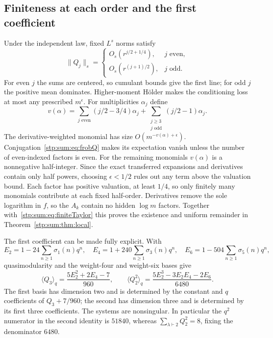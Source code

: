 \documentclass[11pt]{article}
\theoremstyle{remark}\newtheorem{remark}[theorem]{Remark}
\begin{document}
\subsection{Finiteness at each order and the first coefficient}
Under the independent law, fixed $L^s$ norms satisfy
\[
 \|Q_j\|_s=
 \begin{cases}
 O_s(r^{j/2+1/4}),&j\text{ even},\\
 O_s(r^{(j+1)/2}),&j\text{ odd}.
 \end{cases}
\]
For even $j$ the sums are centered, so cumulant bounds give the first line; for odd $j$ the positive mean dominates. Higher-moment Hölder makes the conditioning loss at most any prescribed $m^\epsilon$. For multiplicities $\alpha_j$ define
\[
 v(\alpha)=\sum_{j\text{ even}}(j/2-3/4)\alpha_j
       +\sum_{\substack{j\ge3\\j\text{ odd}}}(j/2-1)\alpha_j.
\]
The derivative-weighted monomial has size $O(m^{-v(\alpha)+\epsilon})$. Conjugation~\eqref{stp:sum:eq:frobQ} makes its expectation vanish unless the number of even-indexed factors is even. For the remaining monomials $v(\alpha)$ is a nonnegative half-integer. Since the exact transferred expansions and derivatives contain only half powers, choosing $\epsilon<1/2$ rules out any term above the valuation bound. Each factor has positive valuation, at least $1/4$, so only finitely many monomials contribute at each fixed half-order. Derivatives remove the sole logarithm in $f$, so the $A_k$ contain no hidden $\log m$ factors. Together with~\eqref{stp:sum:eq:finiteTaylor} this proves the existence and uniform remainder in Theorem~\ref{stp:sum:thm:local}.

The first coefficient can be made fully explicit. With
\[
 E_2=1-24\sum_{n\ge1}\sigma_1(n)q^n,\quad
 E_4=1+240\sum_{n\ge1}\sigma_3(n)q^n,\quad
 E_6=1-504\sum_{n\ge1}\sigma_5(n)q^n,
\]
quasimodularity and the weight-four and weight-six bases give
\begin{equation}\label{stp:sum:eq:twobrackets}
 \langle Q_3\rangle_q=\frac{5E_2^2+2E_4-7}{960},\qquad
 \langle Q_2^2\rangle_q=\frac{5E_2^3-3E_2E_4-2E_6}{6480}.
\end{equation}
The first basis has dimension two and is determined by the constant and $q$ coefficients of $Q_3+7/960$; the second has dimension three and is determined by its first three coefficients. The systems are nonsingular. In particular the $q^2$ numerator in the second identity is $51840$, whereas $\sum_{\lambda\vdash2}Q_2^2=8$, fixing the denominator $6480$.
\end{document}
